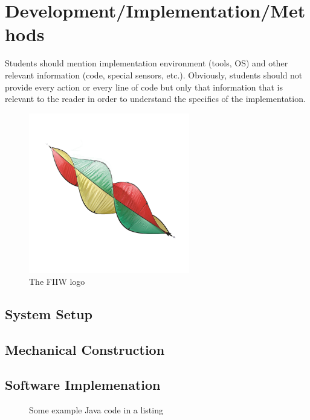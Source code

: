 \chapter{Development/Implementation/Methods}
 
Students should mention implementation environment (tools, OS) and other relevant information (code, special sensors, etc.). Obviously, students should not provide every action or every line of code but only that information that is relevant to the reader in order to understand the specifics of the implementation.\par

\begin{figure}
	\centering\includegraphics[width=7cm]{./images/fiiw}
	\caption{The FIIW logo}
\end{figure}

\lipsum[1]

\lipsum[1]
 
\section{System Setup}
\lipsum[1]

\section{Mechanical Construction}
\lipsum[1]

\section{Software Implemenation}
\begin{figure}
	\lstset{language=Java}
	
	\caption{Some example Java code in a listing}
\end{figure}
\lipsum[1]
